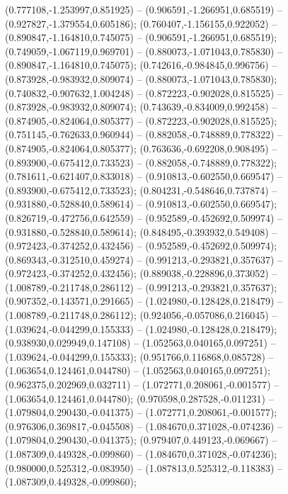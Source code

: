  (0.777108,-1.253997,0.851925) -- (0.906591,-1.266951,0.685519) -- (0.927827,-1.379554,0.605186);
 (0.760407,-1.156155,0.922052) -- (0.890847,-1.164810,0.745075) -- (0.906591,-1.266951,0.685519);
 (0.749059,-1.067119,0.969701) -- (0.880073,-1.071043,0.785830) -- (0.890847,-1.164810,0.745075);
 (0.742616,-0.984845,0.996756) -- (0.873928,-0.983932,0.809074) -- (0.880073,-1.071043,0.785830);
 (0.740832,-0.907632,1.004248) -- (0.872223,-0.902028,0.815525) -- (0.873928,-0.983932,0.809074);
 (0.743639,-0.834009,0.992458) -- (0.874905,-0.824064,0.805377) -- (0.872223,-0.902028,0.815525);
 (0.751145,-0.762633,0.960944) -- (0.882058,-0.748889,0.778322) -- (0.874905,-0.824064,0.805377);
 (0.763636,-0.692208,0.908495) -- (0.893900,-0.675412,0.733523) -- (0.882058,-0.748889,0.778322);
 (0.781611,-0.621407,0.833018) -- (0.910813,-0.602550,0.669547) -- (0.893900,-0.675412,0.733523);
 (0.804231,-0.548646,0.737874) -- (0.931880,-0.528840,0.589614) -- (0.910813,-0.602550,0.669547);
 (0.826719,-0.472756,0.642559) -- (0.952589,-0.452692,0.509974) -- (0.931880,-0.528840,0.589614);
 (0.848495,-0.393932,0.549408) -- (0.972423,-0.374252,0.432456) -- (0.952589,-0.452692,0.509974);
 (0.869343,-0.312510,0.459274) -- (0.991213,-0.293821,0.357637) -- (0.972423,-0.374252,0.432456);
 (0.889038,-0.228896,0.373052) -- (1.008789,-0.211748,0.286112) -- (0.991213,-0.293821,0.357637);
 (0.907352,-0.143571,0.291665) -- (1.024980,-0.128428,0.218479) -- (1.008789,-0.211748,0.286112);
 (0.924056,-0.057086,0.216045) -- (1.039624,-0.044299,0.155333) -- (1.024980,-0.128428,0.218479);
 (0.938930,0.029949,0.147108) -- (1.052563,0.040165,0.097251) -- (1.039624,-0.044299,0.155333);
 (0.951766,0.116868,0.085728) -- (1.063654,0.124461,0.044780) -- (1.052563,0.040165,0.097251);
 (0.962375,0.202969,0.032711) -- (1.072771,0.208061,-0.001577) -- (1.063654,0.124461,0.044780);
 (0.970598,0.287528,-0.011231) -- (1.079804,0.290430,-0.041375) -- (1.072771,0.208061,-0.001577);
 (0.976306,0.369817,-0.045508) -- (1.084670,0.371028,-0.074236) -- (1.079804,0.290430,-0.041375);
 (0.979407,0.449123,-0.069667) -- (1.087309,0.449328,-0.099860) -- (1.084670,0.371028,-0.074236);
 (0.980000,0.525312,-0.083950) -- (1.087813,0.525312,-0.118383) -- (1.087309,0.449328,-0.099860);
